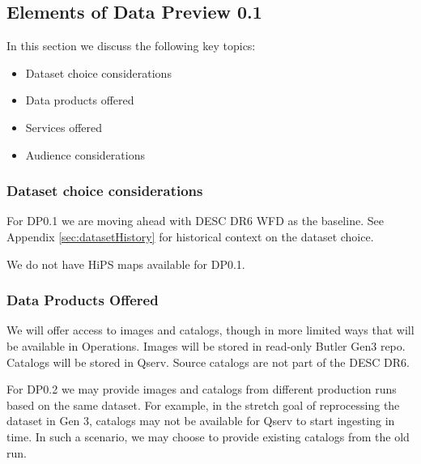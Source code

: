 
\subsection{Elements of Data Preview 0.1} \label{sec:dp0.1}


In this section we discuss the following key topics:

\begin{itemize}

\item Dataset choice considerations

\item Data products offered

\item Services offered

\item Audience considerations

\end{itemize}

\subsubsection {Dataset choice considerations} \label{sec:dataset}

For DP0.1 we are moving ahead with DESC DR6 WFD as the baseline.
See Appendix \ref{sec:datasetHistory} for historical context on the dataset choice.


We do not have  HiPS maps available for DP0.1.



\subsubsection{Data Products Offered} \label{sec:dp01products}

We will offer access to images and catalogs, though in more limited ways that will be available in Operations.
Images will be stored in read-only Butler Gen3 repo.
Catalogs will be stored in Qserv. Source catalogs are not part of the DESC DR6.

For DP0.2 we may provide images and catalogs from different production runs based on the same dataset.
For example, in the stretch goal of reprocessing the dataset in Gen 3, catalogs may not be available for Qserv to start ingesting in time. In such a scenario, we may choose to provide existing catalogs from the old run.

